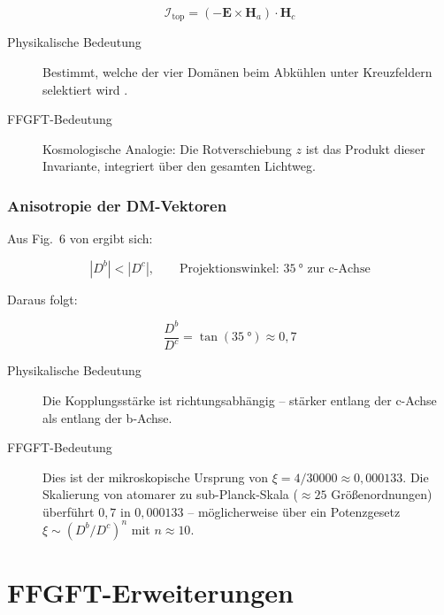 \begin{equation}
  \mathcal{I}_{\mathrm{top}} = (-\mathbf{E}\times\mathbf{H}_a)\cdot\mathbf{H}_c
  \label{eq:topo-invariant}
\end{equation}

\begin{description}
  \item[Physikalische Bedeutung] Bestimmt, welche der vier Domänen beim
    Abkühlen unter Kreuzfeldern selektiert wird \cite{Qureshi2026}.
  \item[FFGFT-Bedeutung] Kosmologische Analogie: Die Rotverschiebung $z$ ist
    das Produkt dieser Invariante, integriert über den gesamten Lichtweg.
\end{description}

\section{Anisotropie der DM-Vektoren}

Aus Fig.~6 von \cite{Qureshi2026} ergibt sich:

\begin{equation}
  |D^b| < |D^c|, \qquad \text{Projektionswinkel: } \SI{35}{\degree}
  \text{ zur c-Achse}
  \label{eq:DM-anisotropy-cond}
\end{equation}

Daraus folgt:

\begin{equation}
  \frac{D^b}{D^c} = \tan(\SI{35}{\degree}) \approx 0{,}7
  \label{eq:DM-ratio}
\end{equation}

\begin{description}
  \item[Physikalische Bedeutung] Die Kopplungsstärke ist richtungsabhängig --
    stärker entlang der c-Achse als entlang der b-Achse.
  \item[FFGFT-Bedeutung] Dies ist der mikroskopische Ursprung von
    $\xi = 4/30000 \approx 0{,}000133$.
    Die Skalierung von atomarer zu sub-Planck-Skala (${\approx}25$
    Größenordnungen) überführt $0{,}7$ in $0{,}000133$ -- möglicherweise
    über ein Potenzgesetz $\xi \sim (D^b/D^c)^n$ mit $n \approx 10$.
\end{description}

\part{FFGFT-Erweiterungen}

